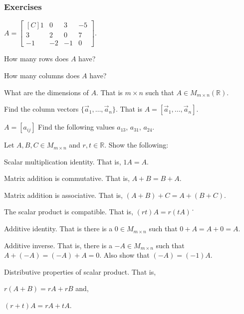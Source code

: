 \subsubsection{Exercises}
\begin{exercise}
$A=\begin{bmatrix*}[C]
1  & 0  & 3  & -5\\
3  & 2  & 0  & 7 \\
-1 & -2 & -1 & 0
\end{bmatrix*}$.\\
\begin{inparaenum}[a.)]
\item How many rows does $A$ have?\\
\item How many columns does $A$ have?\\
\item What are the dimensions of $A$. That is $m \times n$ such that 
$A \in M_{m\times n}(\mathbb{R})$.\\
\item Find the column vectors $\{\vec{a}_1,\ldots,\vec{a}_n\}$. That is
$A=[\vec{a}_1,\ldots,\vec{a}_n]$.\\
\item $A=[a_{ij}]$ Find the following values $a_{13}$, $a_{31}$, $a_{24}$. 
\end{inparaenum}
\end{exercise}
\begin{exercise}
Let $A,B,C \in M_{m\times n}$ and $r,t \in \mathbb{R}$. Show 
the following:\\
\begin{inparaenum}[a.)]
\item Scalar multiplication identity. That is, $1 A=A$.\\
\item Matrix addition is commutative. That is, 
$A+B=B+A$.\\
\item Matrix addition is associative. That is, 
$(A+B)+C=A+(B+C)$.\\
\item The scalar product is compatible. That is, $(rt)A=r(tA)$\.\
\item Additive identity. That is there is a $0\in M_{m\times n}$ such that
 $0+A=A+0=A$.\\
\item Additive inverse. That is, there is a $-A \in M_{m\times n}$ such 
that $A+(-A)=(-A)+A=0$.
Also show that $(-A)=(-1)A$. \\
\item Distributive properties of scalar product. That is, \\
\begin{inparaenum}[i.)]
\indent \item  $r(A+B)=rA+rB$ and,\\
\indent \item  $(r+t)A=rA+tA$.
\end{inparaenum}
\end{inparaenum} 
\end{exercise}
